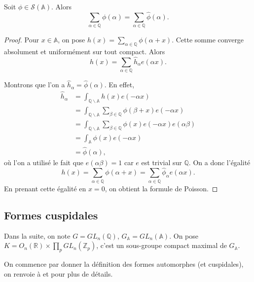 \begin{proposition}
Soit $\phi \in \mathcal{S}(\mathbb{A})$. Alors
\begin{equation}
\sum_{\alpha \in \mathbb{Q}} \phi(\alpha) = \sum_{\alpha \in \mathbb{Q}} \hat{\phi}(\alpha).
\end{equation}
\end{proposition}

\begin{proof}
Pour $x \in \mathbb{A}$, on pose $h(x) = \sum_{\alpha \in \mathbb{Q}} \phi(\alpha+x)$. Cette somme converge absolument et uniformément sur tout compact. Alors
\begin{equation}
h(x) = \sum_{\alpha \in \mathbb{Q}} \hat{h}_\alpha e(\alpha x).
\end{equation}

Montrons que l'on a $\hat{h}_\alpha = \hat{\phi}(\alpha)$. En effet,
\begin{align}
\hat{h}_\alpha &= \int_{\mathbb{Q}\backslash \mathbb{A}} h(x)e(-\alpha x) \\
&=\int_{\mathbb{Q}\backslash \mathbb{A}} \sum_{\beta \in \mathbb{Q}} \phi(\beta+x)e(-\alpha x) \\
&= \int_{\mathbb{Q}\backslash \mathbb{A}} \sum_{\beta \in \mathbb{Q}} \phi(x)e(-\alpha x)e(\alpha \beta) \\
&= \int_{\mathbb{A}} \phi(x) e(-\alpha x) \\
&= \hat{\phi}(\alpha),
\end{align}
où l'on a utilisé le fait que $e(\alpha \beta) = 1$ car $e$ est trivial sur $\mathbb{Q}$. On a donc l'égalité
\begin{equation}
h(x) = \sum_{\alpha \in \mathbb{Q}} \phi(\alpha+x) = \sum_{\alpha \in \mathbb{Q}} \hat{\phi}_\alpha e(\alpha x).
\end{equation}
En prenant cette égalité en $x=0$, on obtient la formule de Poisson.
\end{proof}

\subsection{Formes cuspidales}
Dans la suite, on note $G = GL_n(\mathbb{Q})$, $G_\mathbb{A}=GL_n(\mathbb{A})$. On pose $K = O_n(\mathbb{R}) \times \prod_p GL_n(\mathbb{Z}_p)$, c'est un sous-groupe compact maximal de $G_\mathbb{A}$.

On commence par donner la définition des formes automorphes (et cuspidales), on renvoie à \cite{bump} et \cite{goldfeld-hundley} pour plus de détails.

